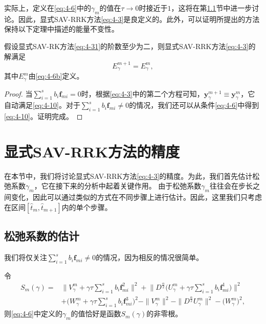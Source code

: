 实际上，定义在\eqref{eq:4-6}中的$\gamma_m$的值在$\tau\rightarrow 0$时接近于$1$，这将在第\ref{Section 5-1}节中进一步讨论。因此，显式SAV-RRK方法\eqref{eq:4-3}是良定义的。此外，可以证明所提出的方法保持以下定理中描述的能量不变性。
\begin{theorem}
假设显式SAV-RK方法\eqref{eq:4-31}的阶数至少为二，则显式SAV-RRK方法\eqref{eq:4-3}的解满足
\begin{equation}
E_{\gamma}^{m+1}=E_{\gamma}^{m}, \label{eq:4-10}
\end{equation}
其中$E_{\gamma}^{m}$由\eqref{eq:4-6b}定义。
\end{theorem}

\begin{proof}
当$\sum\limits_{i=1}^s b_i \bm{f}_{m i}=0$时，根据\eqref{eq:4-3}中的第二个方程可知，$\bm{y}_\gamma^{m+1}\equiv\bm{y}_\gamma^m$，它自动满足\eqref{eq:4-10}。对于$\sum\limits_{i=1}^s b_i \bm{f}_{m i}\neq 0$的情况，我们还可以从条件\eqref{eq:4-6}中得到\eqref{eq:4-10}。证明完成。
\end{proof}

\section{显式SAV-RRK方法的精度}\label{Section 5}
在本节中，我们将讨论显式SAV-RRK方法\eqref{eq:4-3}的精度。为此，我们首先估计松弛系数$\gamma_m$，它在接下来的分析中起着关键作用。
由于松弛系数$\gamma_m$往往会在步长之间变化，因此可以通过类似的方式在不同步骤上进行估计。因此，这里我们只考虑在区间$\left[\hat{t}_m, \hat{t}_{m+1}\right]$内的单个步骤。

\subsection{松弛系数的估计}\label{Section 5-1}

我们将仅关注$\sum\limits_{i=1}^s b_i \bm{f}_{m i} \neq 0$的情况，因为相反的情况很简单。

令
\begin{equation}
\begin{aligned}\label{eq:sm}
S_m(\gamma)=&\big\|V_\gamma^m+\gamma \tau \sum\limits_{i=1}^s b_i \bm{f}_{m i}^2\big\|^2 + \big\|D^\frac{\alpha}{2} \big(U_\gamma^m+\gamma \tau \sum\limits_{i=1}^s b_i \bm{f}_{m i}^1\big)\big\|^2\\
&+\big(W_\gamma^m+\gamma \tau \sum\limits_{i=1}^s b_i \bm{f}_{m i}^3\big)^2-\|V_\gamma^{m}\|^2 - \|D^\frac{\alpha}{2} U_\gamma^{m}\|^2-\big(W_\gamma^{m}\big)^2,
\end{aligned}
\end{equation}
则\eqref{eq:4-6}中定义的$\gamma_m$的值恰好是函数$S_m(\gamma)$的非零根。

